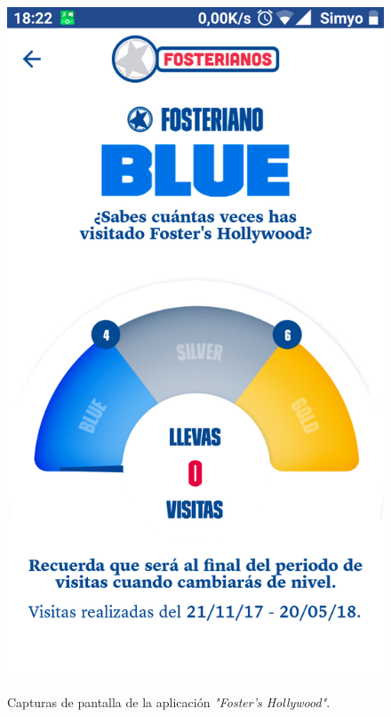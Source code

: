\documentclass[twoside]{report}
\begin{document}
\begin{figure}[H]
\begin{center}
\includegraphics[scale=0.25]{images/restaurantes/foster2.png}
\caption{Capturas de pantalla de la aplicación \textit{"Foster's Hollywood"}.} \cite{fostersh}
\end{center}
\end{figure}
\end{document}
